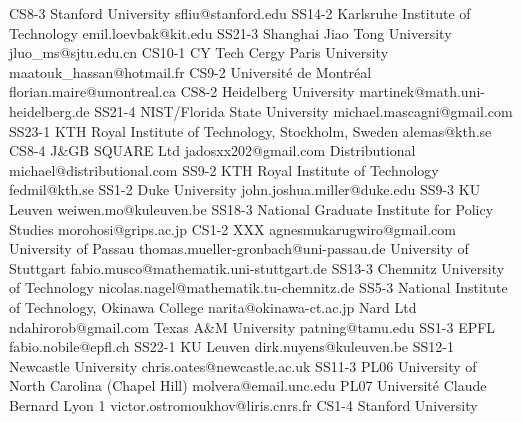 \begin{multicols}{2}
{CS8-3}
{}
{ Stanford University }
{ sfliu@stanford.edu }
{SS14-2}
{}
{ Karlsruhe Institute of Technology }
{ emil.loevbak@kit.edu }
{SS21-3}
{}
{ Shanghai Jiao Tong University }
{ jluo_ms@sjtu.edu.cn }
{CS10-1}
{}
{ CY Tech Cergy Paris University }
{ maatouk_hassan@hotmail.fr }
{CS9-2}
{}
{ Université de Montréal }
{ florian.maire@umontreal.ca }
{CS8-2}
{}
{ Heidelberg University }
{ martinek@math.uni-heidelberg.de }
{SS21-4}
{}
{ NIST/Florida State University }
{ michael.mascagni@gmail.com }
{SS23-1}
{}
{ KTH Royal Institute of Technology, Stockholm, Sweden }
{ alemas@kth.se }
{CS8-4}
{}
{ J\&GB SQUARE Ltd }
{ jadosxx202@gmail.com }
{}
{}
{ Distributional }
{ michael@distributional.com }
{SS9-2}
{}
{ KTH Royal Institute of Technology }
{ fedmil@kth.se }
{SS1-2}
{}
{ Duke University }
{ john.joshua.miller@duke.edu }
{SS9-3}
{}
{ KU Leuven }
{ weiwen.mo@kuleuven.be }
{SS18-3}
{}
{ National Graduate Institute for Policy Studies }
{ morohosi@grips.ac.jp }
{CS1-2}
{}
{ XXX }
{ agnesmukarugwiro@gmail.com }
{}
{}
{ University of Passau }
{ thomas.mueller-gronbach@uni-passau.de }
{}
{}
{ University of Stuttgart }
{ fabio.musco@mathematik.uni-stuttgart.de }
{SS13-3}
{}
{ Chemnitz University of Technology }
{ nicolas.nagel@mathematik.tu-chemnitz.de }
{SS5-3}
{}
{ National Institute of Technology, Okinawa College }
{ narita@okinawa-ct.ac.jp }
{}
{}
{ Nard Ltd }
{ ndahirorob@gmail.com }
{}
{}
{ Texas A\&M University }
{ patning@tamu.edu }
{SS1-3}
{}
{ EPFL }
{ fabio.nobile@epfl.ch }
{SS22-1}
{}
{ KU Leuven }
{ dirk.nuyens@kuleuven.be }
{SS12-1}
{}
{ Newcastle University }
{ chris.oates@newcastle.ac.uk }
{SS11-3}
{PL06}
{ University of North Carolina (Chapel Hill) }
{ molvera@email.unc.edu }
{PL07}
{}
{ Université Claude Bernard Lyon 1 }
{ victor.ostromoukhov@liris.cnrs.fr }
{CS1-4}
{}
{ Stanford University }

\end{multicols}

